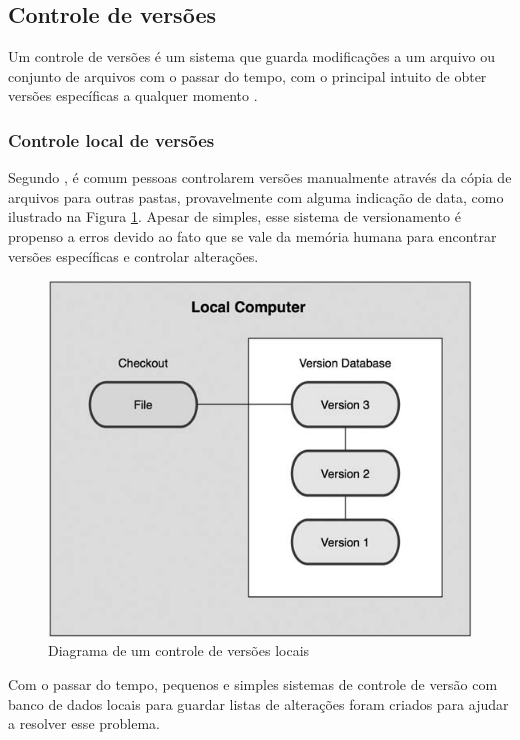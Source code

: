 \subsection{Controle de versões}

Um controle de versões é um sistema que guarda modificações a um arquivo ou conjunto de arquivos com o passar do tempo, com o principal intuito de obter versões específicas a qualquer momento \cite[p. 1]{progit}.


\subsubsection{Controle local de versões}

Segundo \cite[p.2]{progit}, é comum pessoas controlarem versões manualmente através da cópia de arquivos para outras pastas, provavelmente com alguma indicação de data, como ilustrado na Figura \ref{local_version_control}. Apesar de simples, esse sistema de versionamento é propenso a erros devido ao fato que se vale da memória humana para encontrar versões específicas e controlar alterações.

\begin{figure} [ht]
	\centering
	\includegraphics[scale=0.4]{local_version_control.png}
	\caption{Diagrama de um controle de versões locais \cite[p. 1]{progit}}
	\label{local_version_control}
\end{figure}

Com o passar do tempo, pequenos e simples sistemas de controle de versão com banco de dados locais para guardar listas de alterações foram criados para ajudar a resolver esse problema.

